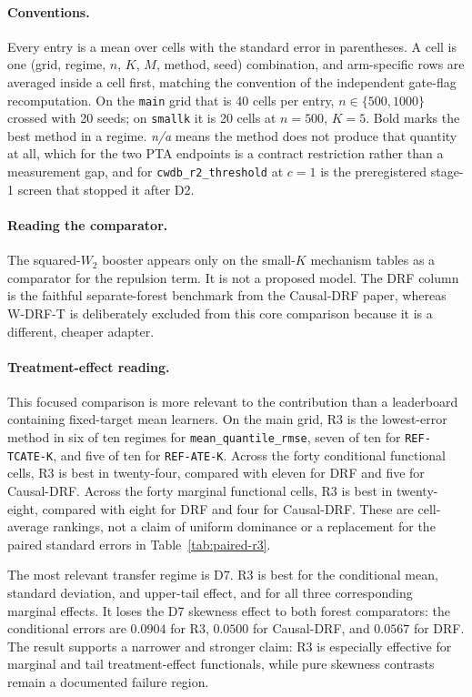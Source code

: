 \documentclass[11pt,a4paper]{article}
\theoremstyle{definition}
\theoremstyle{remark}
\begin{document}
\paragraph{Conventions.} Every entry is a mean over cells with the standard error
in parentheses. A cell is one (grid, regime, $n$, $K$, $M$, method, seed)
combination, and arm-specific rows are averaged inside a cell first, matching the
convention of the independent gate-flag recomputation. On the \texttt{main} grid
that is 40 cells per entry, $n \in \{500, 1000\}$ crossed with 20 seeds; on
\texttt{smallk} it is 20 cells at $n = 500$, $K = 5$. Bold marks the best method
in a regime. \emph{n/a} means the method does not produce that quantity at all,
which for the two PTA endpoints is a contract restriction rather than a
measurement gap, and for \texttt{cwdb\_r2\_threshold} at $c = 1$ is the
preregistered stage-1 screen that stopped it after D2.

\paragraph{Reading the comparator.} The squared-$W_2$ booster appears only on
the small-$K$ mechanism tables as a comparator for the repulsion term. It is not
a proposed model. The DRF column is the faithful separate-forest benchmark from
the Causal-DRF paper, whereas W-DRF-T is deliberately excluded from this core
comparison because it is a different, cheaper adapter.

\paragraph{Treatment-effect reading.} This focused comparison is more relevant
to the contribution than a leaderboard containing fixed-target mean learners.
On the main grid, R3 is the lowest-error method in six of ten regimes for
\texttt{mean\_quantile\_rmse}, seven of ten for \texttt{REF-TCATE-K}, and five
of ten for \texttt{REF-ATE-K}. Across the forty conditional functional cells,
R3 is best in twenty-four, compared with eleven for DRF and five for
Causal-DRF. Across the forty marginal functional cells, R3 is best in
twenty-eight, compared with eight for DRF and four for Causal-DRF. These are
cell-average rankings, not a claim of uniform dominance or a replacement for
the paired standard errors in Table~\ref{tab:paired-r3}.

The most relevant transfer regime is D7. R3 is best for the conditional mean,
standard deviation, and upper-tail effect, and for all three corresponding
marginal effects. It loses the D7 skewness effect to both forest comparators:
the conditional errors are $0.0904$ for R3, $0.0500$ for Causal-DRF, and
$0.0567$ for DRF. The result supports a narrower and stronger claim: R3 is
especially effective for marginal and tail treatment-effect functionals, while
pure skewness contrasts remain a documented failure region.
\end{document}
